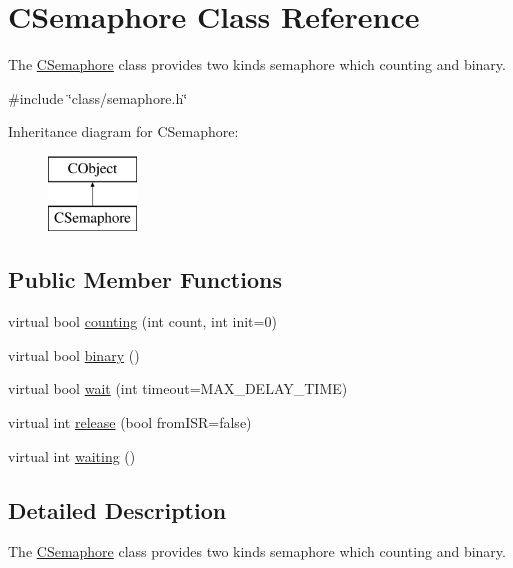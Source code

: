 \hypertarget{class_c_semaphore}{\section{C\-Semaphore Class Reference}
\label{class_c_semaphore}
}


The \hyperlink{class_c_semaphore}{C\-Semaphore} class provides two kinds semaphore which counting and binary.  




{\ttfamily \#include \char`\"{}class/semaphore.\-h\char`\"{}}

Inheritance diagram for C\-Semaphore\-:\begin{figure}[H]
\begin{center}
\leavevmode
\includegraphics[height=2.000000cm]{class_c_semaphore}
\end{center}
\end{figure}
\subsection*{Public Member Functions}
\begin{DoxyCompactItemize}
\item 
virtual bool \hyperlink{class_c_semaphore_af4e913cd2861355f8be2211ae21753ba}{counting} (int count, int init=0)
\item 
virtual bool \hyperlink{class_c_semaphore_a0fc078dfd286cb3321c6cbaf7bcbb7b2}{binary} ()
\item 
virtual bool \hyperlink{class_c_semaphore_abad6f22e40a0d911e38ade968f4d801a}{wait} (int timeout=M\-A\-X\-\_\-\-D\-E\-L\-A\-Y\-\_\-\-T\-I\-M\-E)
\item 
virtual int \hyperlink{class_c_semaphore_aa1a25ff1be26f8dfdd0f008aeabec8b1}{release} (bool from\-I\-S\-R=false)
\item 
virtual int \hyperlink{class_c_semaphore_a2302ceb8f2f9e1bef3381f457589177d}{waiting} ()
\end{DoxyCompactItemize}


\subsection{Detailed Description}
The \hyperlink{class_c_semaphore}{C\-Semaphore} class provides two kinds semaphore which counting and binary. 

